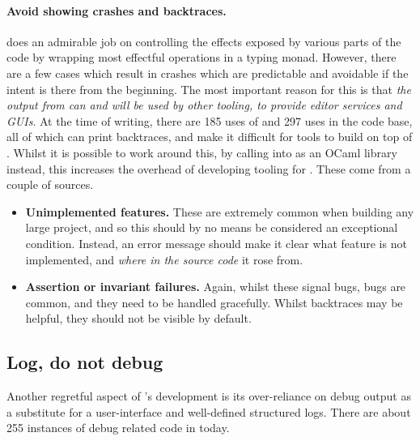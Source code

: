 \paragraph{Avoid showing crashes and backtraces.}  does an admirable job
on controlling the effects exposed by various parts of the code by wrapping
most effectful operations in a typing monad. However, there are a few cases
which result in crashes which are predictable and avoidable if the intent is
there from the beginning. The most important reason for this is that \emph{the
output from  can and will be used by other tooling, to provide editor
services and GUIs}.\label{sn:gui-issues} At the time of writing, there are 185 uses of
 and 297 uses  in the code
base, all of which can print backtraces, and make it difficult for
tools to build on top of . Whilst it is possible to work
around this, by calling into  as an OCaml library instead,
this increases the overhead of developing tooling for .
These come from a couple of sources.
\begin{itemize}
    \item \textbf{Unimplemented features.} These are extremely common when
        building any large project, and so this should by no means be
        considered an exceptional condition. Instead, an error message should
        make it clear what feature is not implemented, and \emph{where in the
        source code} it rose from.
    \item \textbf{Assertion or invariant failures.} Again, whilst these signal
        bugs, bugs are common, and they need to be handled gracefully. Whilst
        backtraces may be helpful, they should not be visible by default.
\end{itemize}

\subsection{Log, do not debug}

Another regretful aspect of 's development is its over-reliance on debug
output as a substitute for a user-interface and well-defined structured logs.
There are about 255 instances of debug related code in  today.

